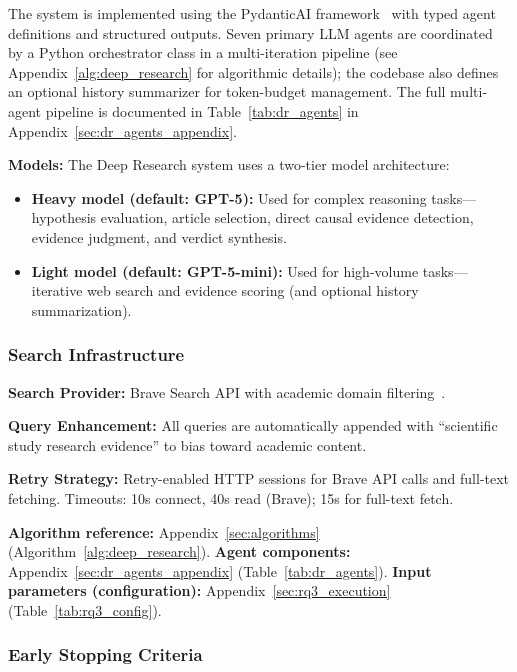 The system is implemented using the PydanticAI framework~\cite{pydanticai2024} with typed agent definitions and structured outputs. Seven primary LLM agents are coordinated by a Python orchestrator class in a multi-iteration pipeline (see Appendix~\ref{alg:deep_research} for algorithmic details); the codebase also defines an optional history summarizer for token-budget management. The full multi-agent pipeline is documented in Table~\ref{tab:dr_agents} in Appendix~\ref{sec:dr_agents_appendix}.

\textbf{Models:} The Deep Research system uses a two-tier model architecture:
\begin{itemize}[noitemsep]
    \item \textbf{Heavy model (default: GPT-5):} Used for complex reasoning tasks---hypothesis evaluation, article selection, direct causal evidence detection, evidence judgment, and verdict synthesis.
    \item \textbf{Light model (default: GPT-5-mini):} Used for high-volume tasks---iterative web search and evidence scoring (and optional history summarization).
\end{itemize}


\FloatBarrier

\subsubsection{Search Infrastructure}

\textbf{Search Provider:} Brave Search API with academic domain filtering~\cite{bravesearchapi}.


\textbf{Query Enhancement:} All queries are automatically appended with ``scientific study research evidence'' to bias toward academic content.

\textbf{Retry Strategy:} Retry-enabled HTTP sessions for Brave API calls and full-text fetching. Timeouts: 10s connect, 40s read (Brave); 15s for full-text fetch.

\textbf{Algorithm reference:} Appendix~\ref{sec:algorithms} (Algorithm~\ref{alg:deep_research}). \textbf{Agent components:} Appendix~\ref{sec:dr_agents_appendix} (Table~\ref{tab:dr_agents}). \textbf{Input parameters (configuration):} Appendix~\ref{sec:rq3_execution} (Table~\ref{tab:rq3_config}).

\subsubsection{Early Stopping Criteria}


